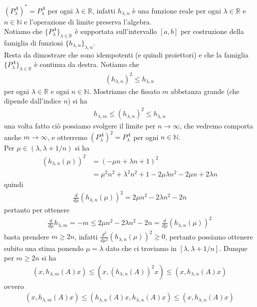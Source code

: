 \documentclass{article}
\numberwithin{equation}{subsection}
\begin{document}
$(P^A_\lambda)^* = P^A_\lambda$ per ogni $\lambda \in \mathbb{R}$, infatti $h_{\lambda, n}$ è una funzione reale per ogni $\lambda \in \mathbb{R}$ e $n \in \mathbb{N}$ e l'operazione di limite preserva l'algebra. \\
Notiamo che $\{P^A_\lambda\}_{\lambda \in \mathbb{R}}$ è supportata sull'intervallo $[a, b]$ per costruzione della famiglia di funzioni $\{h_{\lambda, n}\}_{\lambda, n}$. \\
Resta da dimostrare che sono idempotenti (e quindi proiettori) e che la famiglia $\{P^A_\lambda\}_{\lambda \in \mathbb{R}}$ è continua da destra. Notiamo che 
\begin{align*}
    (h_{\lambda, n})^2 \leq h_{\lambda, n} 
\end{align*}
per ogni $\lambda \in \mathbb{R}$ e ogni $n \in \mathbb{N}$. Mostriamo che fissato $m$ abbstanza grande (che dipende dall'indice $n$) si ha 
\begin{align*}
    h_{\lambda, m} \leq (h_{\lambda, n})^2 \leq h_{\lambda, n} 
\end{align*}
una volta fatto ciò possiamo svolgere il limite per $n \rightarrow \infty$, che vedremo comporta anche $m \rightarrow \infty$, e otterremo $(P^A_\lambda)^2 = P^A_\lambda$ per ogni $n \in \mathbb{N}$. \\
Per $\mu \in (\lambda, \lambda + 1/n)$ si ha 
\begin{align*}
    (h_{\lambda, n}(\mu))^2 &= (-\mu n + \lambda n + 1)^2  \\
    &= \mu^2n^2 + \lambda^2n^2 + 1 - 2\mu\lambda n^2 - 2\mu n + 2\lambda n 
\end{align*}
quindi 
\begin{align*}
    \frac{d}{d\mu}(h_{\lambda, n}(\mu))^2 = 2\mu n^2 - 2\lambda n^2 - 2n 
\end{align*}
pertanto per ottenere 
\begin{align*}
    \frac{d}{d\mu}h_{\lambda, m} = -m \leq 2\mu n^2 - 2\lambda n^2 - 2n = \frac{d}{d\mu}(h_{\lambda, n}(\mu))^2 
\end{align*}
basta prendere $m \geq 2n$, infatti $\frac{d^2}{d\mu^2}(h_{\lambda, n}(\mu))^2 \geq 0$, pertanto possiamo ottenere subito una stima ponendo $\mu = \lambda$ dato che ci troviamo in $[\lambda, \lambda + 1/n]$. Dunque per $m \geq 2n$ si ha 
\begin{align*}
    (x, h_{\lambda, m}(A)x) \leq (x, (h_{\lambda, n}(A))^2x) \leq (x, h_{\lambda, n}(A)x) 
\end{align*}
ovvero 
\begin{align*}
    (x, h_{\lambda, m}(A)x) \leq (h_{\lambda, n}(A)x, h_{\lambda, n}(A)x) \leq (x, h_{\lambda, n}(A)x) 
\end{align*}
\end{document}
